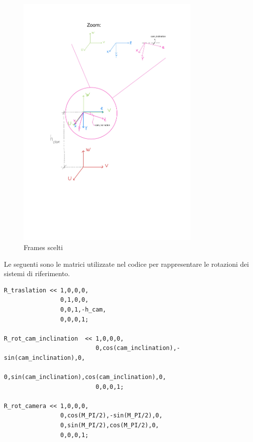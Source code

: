 \begin{figure}[H]
	\centering
	\includegraphics[width=0.8\textwidth]{Immagini/RoboticsFrames-2.jpg}
	\caption{Frames scelti}
	\label{fig:frames}
\end{figure}


Le seguenti sono le matrici utilizzate nel codice per rappresentare le rotazioni dei sistemi di riferimento.
\begin{lstlisting}
R_traslation << 1,0,0,0,
				0,1,0,0,
				0,0,1,-h_cam,
				0,0,0,1;

R_rot_cam_inclination  << 1,0,0,0,
					      0,cos(cam_inclination),-sin(cam_inclination),0,
						  0,sin(cam_inclination),cos(cam_inclination),0,
						  0,0,0,1;

R_rot_camera << 1,0,0,0,
				0,cos(M_PI/2),-sin(M_PI/2),0,
				0,sin(M_PI/2),cos(M_PI/2),0,
				0,0,0,1;
\end{lstlisting}